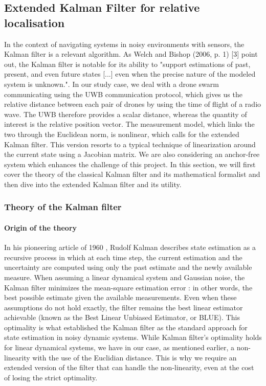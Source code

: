 \subsection{Extended Kalman Filter for relative localisation  }
In the context of navigating systems in noisy environments with sensors, the Kalman filter is a relevant algorithm. As Welch and Bishop (2006, p. 1) [3] point out, the Kalman filter is notable for its ability to "support estimations of past, present, and even future states [...] even when the precise nature of the modeled system is unknown.". In our study case, we deal with a drone swarm communicating using the UWB communication protocol, which gives us the relative distance between each pair of drones by using the time of flight of a radio wave. The UWB therefore provides a scalar distance, whereas the quantity of interest is the relative position vector. The measurement model, which links the two through the Euclidean norm, is nonlinear, which calls for the extended Kalman filter. This version resorts to a typical technique of linearization around the current state using a Jacobian matrix. We are also considering an anchor-free system which enhances the challenge of this project. In this section, we will first cover the theory of the classical Kalman filter and its mathematical formalist and then dive into the extended Kalman filter and its utility.


\subsubsection{Theory of the Kalman filter}

\paragraph{Origin of the theory}

In his pioneering article of 1960 \parencite{kalman1960}, 
Rudolf Kalman describes state estimation as a recursive process in which at each time step, 
the current estimation and the uncertainty are computed using only the past estimate and the newly available measure. When assuming a linear dynamical system and Gaussian noise, the Kalman filter minimizes the mean-square estimation error : in other words, the best possible estimate given the available measurements. Even when these assumptions do not hold exactly, the filter remains the best linear estimator achievable (known as the Best Linear Unbiased Estimator, or BLUE). This optimality is what established the Kalman filter as the standard approach for state estimation in noisy dynamic systems. While Kalman filter's optimality holds for linear dynamical systems, we have in our case, as mentioned earlier, a non-linearity with the use of the Euclidian distance. This is why we require an extended version of the filter that can handle the non-linearity, even at the cost of losing the strict optimality.


